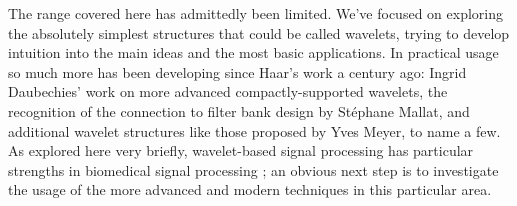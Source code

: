 \documentclass[letterpaper]{article}
\begin{document}
The range covered here has admittedly been limited.
We've focused on exploring the absolutely simplest structures that could be called wavelets,
trying to develop intuition into the main ideas and the most basic applications.
In practical usage so much more has been developing since Haar's work a century ago:
Ingrid Daubechies' work on more advanced compactly-supported wavelets,
the recognition of the connection to filter bank design by St\'{e}phane Mallat,
and additional wavelet structures like those proposed by Yves Meyer, to name a few.
As explored here very briefly, wavelet-based signal processing has particular strengths in
biomedical signal processing \cite[p.~218]{burrus};
an obvious next step is to investigate the usage of the more advanced and modern techniques
in this particular area.

\newpage


\end{document}
